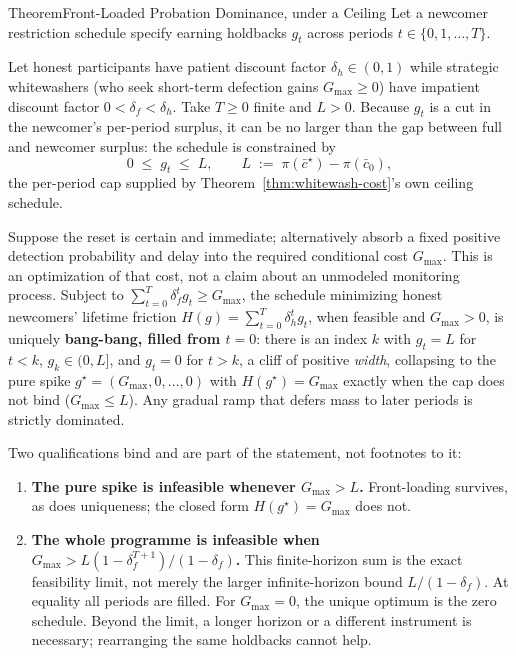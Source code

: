 \documentclass[11pt,a4paper]{article}
\theoremstyle{definition}
\begin{document}
\begin{pdclaim}{Theorem}{Front-Loaded Probation Dominance, \mbox{under} a Ceiling}
\setlength{\parskip}{4pt plus 1pt}
\label{thm:probation-dominance}
Let a newcomer restriction schedule specify earning holdbacks $g_t$ across periods
$t\in\{0,1,\dots,T\}$.

Let honest participants have patient discount factor
$\delta_h\in(0,1)$ while strategic whitewashers (who seek short-term defection gains
$G_{\max}\ge0$) have impatient discount factor $0<\delta_f<\delta_h$. Take
$T\ge0$ finite and $L>0$. Because $g_t$ is a cut
in the newcomer's per-period surplus, it can be no larger than the gap between
full and newcomer surplus: the schedule is constrained by
\[
  0 \;\le\; g_t \;\le\; L, \qquad L \;:=\; \pi(\bar{c}^\star)-\pi(\bar{c}_0),
\]
the per-period cap supplied by Theorem~\ref{thm:whitewash-cost}'s own ceiling
schedule.

Suppose the reset is certain and immediate; alternatively absorb a fixed
positive detection probability and delay into the required conditional
cost $G_{\max}$. This is an optimization of that cost, not a claim about an
unmodeled monitoring process. Subject to
$\sum_{t=0}^T \delta_f^t g_t \ge G_{\max}$, the schedule minimizing honest
newcomers' lifetime friction $H(g)=\sum_{t=0}^T \delta_h^t g_t$, when feasible
and $G_{\max}>0$, is uniquely
\textbf{bang-bang, filled from $t=0$}: there is an index $k$ with $g_t=L$ for
$t<k$, $g_k\in(0,L]$, and $g_t=0$ for $t>k$, a cliff of positive \emph{width},
collapsing to the pure spike $g^\star=(G_{\max},0,\dots,0)$ with
$H(g^\star)=G_{\max}$ exactly when the cap does not bind ($G_{\max}\le L$). Any
gradual ramp that defers mass to later periods is strictly dominated.

Two
qualifications bind and are part of the statement, not footnotes to it:
\begin{enumerate}[leftmargin=1.6em,itemsep=1pt]
  \item \textbf{The pure spike is infeasible whenever $G_{\max}>L$.} Front-loading
  survives, as does uniqueness; the closed form $H(g^\star)=G_{\max}$ does not.
  \item \textbf{The whole programme is infeasible when
  $G_{\max}>L(1-\delta_f^{T+1})/(1-\delta_f)$.} This finite-horizon sum is the
  exact feasibility limit, not merely the larger infinite-horizon bound
  $L/(1-\delta_f)$. At equality all periods are filled. For $G_{\max}=0$, the
  unique optimum is the zero schedule. Beyond the limit, a longer horizon or a
  different instrument is necessary; rearranging the same holdbacks cannot help.
\end{enumerate}
\end{pdclaim}
\end{document}
